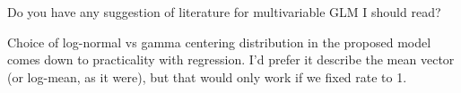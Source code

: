 \documentclass{article}
\begin{document}
Do you have any suggestion of literature for multivariable GLM I should read?

Choice of log-normal vs gamma centering distribution in the proposed model comes down to practicality with regression.  I'd prefer it describe the mean vector (or log-mean, as it were), but that would only work if we fixed rate to 1.





















    
\end{document}
